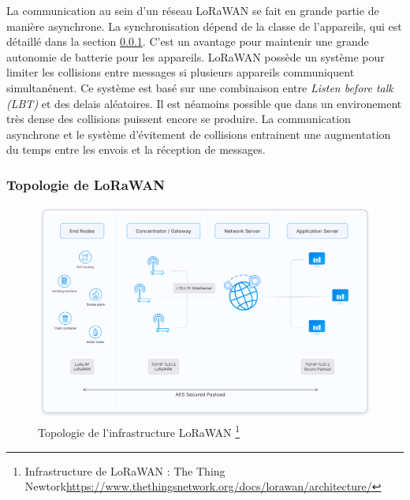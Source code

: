 \vspace{0.1cm}

La communication au sein d'un réseau LoRaWAN se fait en grande partie de manière asynchrone. La synchronisation dépend de la classe de l'appareils, qui est détaillé dans la section \ref{topolora}. C'est un avantage pour maintenir une grande autonomie de batterie pour les appareils. LoRaWAN possède un système pour limiter les collisions entre messages si plusieurs appareils communiquent simultanénent. Ce système est basé sur une combinaison entre \textit{Listen before talk (LBT)} et des delais aléatoires\cite{loracolision}. Il est néamoins possible que dans un environement très dense des collisions puissent encore se produire. La communication asynchrone et le système d'évitement de collisions entrainent une augmentation du temps entre les envois et la réception de messages.

\subsubsection{Topologie de LoRaWAN}\label{topolora}

\begin{figure}[h]
\centering

\includegraphics[scale=0.1]{images/architecture.png}
\caption{Topologie de l'infrastructure LoRaWAN \protect\footnote{Infrastructure de LoRaWAN : The Thing Newtork\href{https://www.thethingsnetwork.org/docs/lorawan/architecture/}{https://www.thethingsnetwork.org/docs/lorawan/architecture/}}}\label{term7}
\end{figure}

